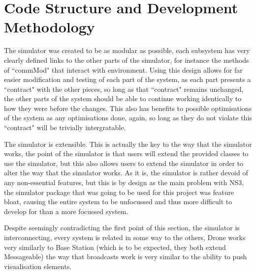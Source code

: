 \section{Code Structure and Development Methodology}

	The simulator was created to be as modular as possible, each subsystem has very clearly defined
	links to the other parts of the simulator, for instance the methods of ``commMod" that interact
	with environment. Using this design allows for far easier modification and testing of each part
	of the system, as each part presents a ``contract" with the other pieces, so long as that ``contract"
	remains unchanged, the other parts of the system should be able to continue working identically
	to how they were before the changes. This also has benefits to possible optimisations of the system
	as any optimisations done, again, so long as they do not violate this ``contract" will be trivially
	intergratable.

	The simulator is extensible. This is actually the key to the way that the simulator works, the point
	of the simulator is that users will extend the provided classes to use the simulator, but this also
	allows users to extend the simulator in order to alter the way that the simulator works. As it is,
	the simulator is rather devoid of any non-essential features, but this is by design as the main problem
	with NS3, the simulator package that was going to be used for this project was feature bloat, causing
	the entire system to be unfocussed and thus more difficult to develop for than a more focussed system.

	Despite seemingly contradicting the first point of this section, the simulator is interconnecting,
	every system is related in some way to the others, Drone works very similarly to Base Station
	(which is to be expected, they both extend Messageable) the way that broadcasts work is very similar
	to the ability to push visualisation elements.


